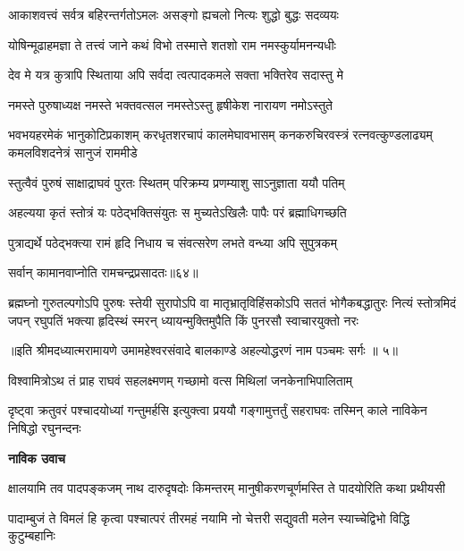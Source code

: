 \twolineshloka
{आकाशवत्त्वं सर्वत्र बहिरन्तर्गतोऽमलः}
{असङ्गो ह्यचलो नित्यः शुद्धो बुद्धः सदव्ययः} %

\twolineshloka
{योषिन्मूढाहमज्ञा ते तत्त्वं जाने कथं विभो}
{तस्मात्ते शतशो राम नमस्कुर्यामनन्यधीः} %

\twolineshloka
{देव मे यत्र कुत्रापि स्थिताया अपि सर्वदा}
{त्वत्पादकमले सक्ता भक्तिरेव सदास्तु मे} %

\twolineshloka
{नमस्ते पुरुषाध्यक्ष नमस्ते भक्तवत्सल}
{नमस्तेऽस्तु हृषीकेश नारायण नमोऽस्तुते} %

\fourlineindentedshloka
{भवभयहरमेकं भानुकोटिप्रकाशम्}
{करधृतशरचापं कालमेघावभासम्}
{कनकरुचिरवस्त्रं रत्नवत्कुण्डलाढ्यम्}
{कमलविशदनेत्रं सानुजं राममीडे} %

\twolineshloka
{स्तुत्वैवं पुरुषं साक्षाद्राघवं पुरतः स्थितम्}
{परिक्रम्य प्रणम्याशु साऽनुज्ञाता ययौ पतिम्} %

\twolineshloka
{अहल्यया कृतं स्तोत्रं यः पठेद्भक्तिसंयुतः}
{स मुच्यतेऽखिलैः पापैः परं ब्रह्माधिगच्छति} %

\twolineshloka
{पुत्राद्यर्थे पठेद्भक्त्या रामं हृदि निधाय च}
{संवत्सरेण लभते वन्ध्या अपि सुपुत्रकम्} %

{सर्वान् कामानवाप्नोति रामचन्द्रप्रसादतः॥६४॥} %


\fourlineindentedshloka
{ब्रह्मघ्नो गुरुतल्पगोऽपि पुरुषः स्तेयी सुरापोऽपि वा}
{मातृभ्रातृविहिंसकोऽपि सततं भोगैकबद्धातुरः}
{नित्यं स्तोत्रमिदं जपन् रघुपतिं भक्त्या हृदिस्थं स्मरन्}
{ध्यायन्मुक्तिमुपैति किं पुनरसौ स्वाचारयुक्तो नरः} %

{॥इति श्रीमदध्यात्मरामायणे उमामहेश्वरसंवादे बालकाण्डे
अहल्योद्धरणं नाम पञ्चमः सर्गः ॥ ५॥
}




\twolineshloka
{विश्वामित्रोऽथ तं प्राह राघवं सहलक्ष्मणम्}
{गच्छामो वत्स मिथिलां जनकेनाभिपालिताम्} %

\threelineshloka
{दृष्ट्वा क्रतुवरं पश्चादयोध्यां गन्तुमर्हसि}
{इत्युक्त्वा प्रययौ गङ्गामुत्तर्तुं सहराघवः}
{तस्मिन् काले नाविकेन निषिद्धो रघुनन्दनः} %

\textbf{नाविक उवाच}

\fourlineindentedshloka
{क्षालयामि तव पादपङ्कजम्}
{नाथ दारुदृषदोः किमन्तरम्}
{मानुषीकरणचूर्णमस्ति ते}
{पादयोरिति कथा प्रथीयसी} %

\fourlineindentedshloka
{पादाम्बुजं ते विमलं हि कृत्वा}
{पश्चात्परं तीरमहं नयामि}
{नो चेत्तरी सद्युवती मलेन}
{स्याच्चेद्विभो विद्धि कुटुम्बहानिः} %

